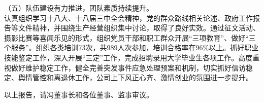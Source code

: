 （五）队伍建设有力推进，团队素质持续提升。\\
\indent 认真组织学习十八大、十八届三中全会精神，党的群众路线相关论述、政府工作报告等文件精神，并围绕生产经营组织集中讨论，取得了良好实效。通过征文活动、摄影比赛等喜闻乐见的形式，组织党员干部和职工群众开展“三项教育”、做好“三个服务”。组织各类培训73次，共989人次参加，培训合格率在96\%以上。抓好职业技能鉴定工作，深入开展“三定”工作，完成招聘录用大学毕业生各项工作。高度重视做好维护稳定工作，健全完善突发事件应急处理预案和机制，切实抓好信访稳定、舆情管控和离退休工作，公司上下风正心齐、激情创业的氛围进一步提升。

以上报告，请冯董事长和各位董事、监事审议。








